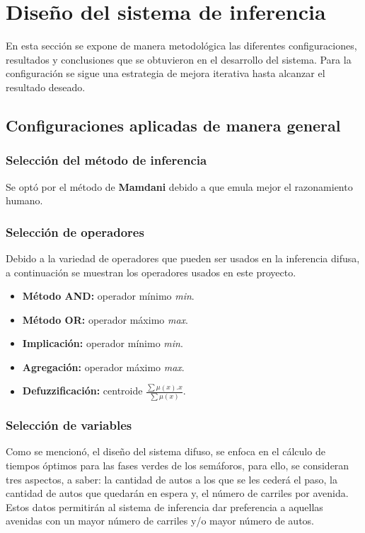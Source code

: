 \section{Diseño del sistema de inferencia}\label{section:desarrolloFIS}
En esta sección se expone de manera metodológica las diferentes configuraciones, resultados y conclusiones que se obtuvieron en el desarrollo del sistema. Para la configuración se sigue una estrategia de mejora iterativa hasta alcanzar el resultado deseado.

\subsection{Configuraciones aplicadas de manera general}
\subsubsection{Selección del método de inferencia}
Se optó por el método de \textbf{Mamdani} debido a que emula mejor el razonamiento humano.

\subsubsection{Selección de operadores}
Debido a la variedad de operadores que pueden ser usados en la inferencia difusa, a continuación se muestran los operadores usados en este proyecto.

\begin{itemize}
	\item \textbf{Método AND:} operador mínimo \emph{min}.
	\item \textbf{Método OR:} operador máximo \emph{max}.
	\item \textbf{Implicación:} operador mínimo \emph{min}.
	\item \textbf{Agregación:} operador máximo \emph{max}.
	\item \textbf{Defuzzificación:} centroide \emph{$\frac{\sum \mu(x).x}{\sum \mu(x)}$}.
\end{itemize}

\subsubsection{Selección de variables}
Como se mencionó, el diseño del sistema difuso, se enfoca en el cálculo de tiempos óptimos para las fases verdes de los semáforos, para ello, se consideran tres aspectos, a saber: la cantidad de autos a los que se les cederá el paso, la cantidad de autos que quedarán en espera y, el número de carriles por avenida. Estos datos permitirán al sistema de inferencia dar preferencia a aquellas avenidas con un mayor número de carriles y/o mayor número de autos.

